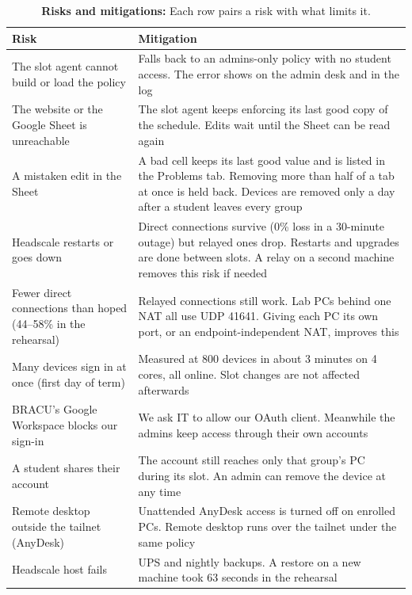 \documentclass[11pt,a4paper]{article}
\begin{document}
\begin{table}[H]
\centering\footnotesize
\caption{\textbf{Risks and mitigations:} Each row pairs a risk with what limits it.}
\label{tab:risks}
\begin{tabularx}{\textwidth}{P{5.0cm}Y}
\toprule
Risk & Mitigation \\
\midrule
The slot agent cannot build or load the policy & Falls back to an admins-only policy with no student access. The error shows on the admin desk and in the log \\
The website or the Google Sheet is unreachable & The slot agent keeps enforcing its last good copy of the schedule. Edits wait until the Sheet can be read again \\
A mistaken edit in the Sheet & A bad cell keeps its last good value and is listed in the Problems tab. Removing more than half of a tab at once is held back. Devices are removed only a day after a student leaves every group \\
Headscale restarts or goes down & Direct connections survive (0\% loss in a 30-minute outage) but relayed ones drop. Restarts and upgrades are done between slots. A relay on a second machine removes this risk if needed \\
Fewer direct connections than hoped (44--58\% in the rehearsal) & Relayed connections still work. Lab PCs behind one NAT all use UDP 41641. Giving each PC its own port, or an endpoint-independent NAT, improves this \\
Many devices sign in at once (first day of term) & Measured at 800 devices in about 3 minutes on 4 cores, all online. Slot changes are not affected afterwards \\
BRACU's Google Workspace blocks our sign-in & We ask IT to allow our OAuth client. Meanwhile the admins keep access through their own accounts \\
A student shares their account & The account still reaches only that group's PC during its slot. An admin can remove the device at any time \\
Remote desktop outside the tailnet (AnyDesk) & Unattended AnyDesk access is turned off on enrolled PCs. Remote desktop runs over the tailnet under the same policy \\
Headscale host fails & UPS and nightly backups. A restore on a new machine took 63 seconds in the rehearsal \\
\bottomrule
\end{tabularx}
\end{table}
\end{document}
